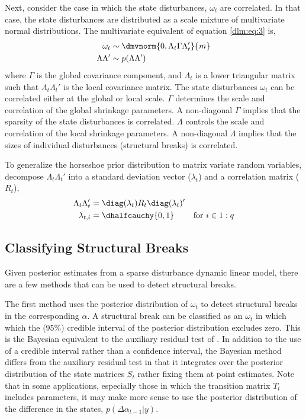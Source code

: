 Next, consider the case in which the state disturbances, $\omega_{t}$ are correlated.
In that case, the state disturbances are distributed as a scale mixture of multivariate normal distributions.
The multivariate equivalent of equation \eqref{dlm:eq:3} is,
\begin{equation}
  \begin{aligned}[t]
    \omega_{t} &\sim \dmvnorm{0, \Lambda_{t} \Gamma \Lambda_{t}'}{m} \\
    \Lambda \Lambda' & \sim p(\Lambda \Lambda')
  \end{aligned}
\end{equation}
where $\Gamma$ is the global covariance component, and $\Lambda_{t}$ is a lower triangular matrix such that  $\Lambda_{t} \Lambda_{t}'$ is the local covariance matrix.
The state disturbances $\omega_{t}$ can be correlated either at the global or local scale.
$\Gamma$ determines the scale and correlation of the global shrinkage parameters.
A non-diagonal $\Gamma$ implies that the sparsity of the state disturbances is correlated.
$\Lambda$ controls the scale and correlation of the local shrinkage parameters.
A non-diagonal $\Lambda$ implies that the sizes of individual disturbances (structural breaks) is correlated.

To generalize the horseshoe prior distribution to matrix variate random variables, decompose $\Lambda_{t} \Lambda_{t}'$ into a standard deviation vector ($\lambda_{t}$) and a correlation matrix ($R_{t}$),%
\begin{align}
  \label{dlm:eq:16}
  \Lambda_{t} \Lambda_{t}' &= \diag(\lambda_{t}) R_{t} \diag(\lambda_{t})' \\
  \label{dlm:eq:17}
  \lambda_{t,i} &= \dhalfcauchy{0, 1} & \text{for $i \in 1:q$}
\end{align}


\subsection{Classifying Structural Breaks}
\label{dlm:sec:structural-breaks}

Given posterior estimates from a sparse disturbance dynamic linear model, there are a few methods that can be used to detect structural breaks.

The first method uses the posterior distribution of $\omega_{t}$ to detect structural breaks in the corresponding $\alpha$.
A structural break can be classified as an $\omega_{t}$ in which which the (95\%) credible interval of the posterior distribution excludes zero.
This is the Bayesian equivalent to the auxiliary residual test of \textcites{JongPenzer1998}{DurbinKoopman2001}.%
In addition to the use of a credible interval rather than a confidence interval, the Bayesian method differs from the auxiliary residual test in that it integrates over the posterior distribution of the state matrices $S_{t}$ rather fixing them at point estimates.
Note that in some applications, especially those in which the transition matrix $T_{t}$ includes parameters, it may make more sense to use the posterior distribution of the difference in the states, $p(\Delta \alpha_{t - 1} | y)$.

